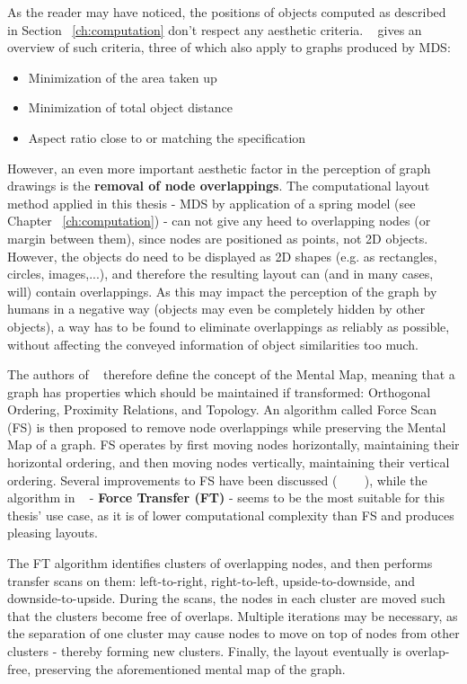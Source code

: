 As the reader may have noticed, the positions of objects computed as described in Section ~\ref{ch:computation} don't respect any aesthetic criteria. ~\cite{Li:2005} gives an overview of such criteria, three of which also apply to graphs produced by MDS:

\begin{itemize}
	\item Minimization of the area taken up
	\item Minimization of total object distance
	\item Aspect ratio close to or matching the specification
\end{itemize}

However, an even more important aesthetic factor in the perception of graph drawings is the \textbf{removal of node overlappings}. The computational layout method applied in this thesis - MDS by application of a spring model (see Chapter ~\ref{ch:computation}) - can not give any heed to overlapping nodes (or margin between them), since nodes are positioned as points, not 2D objects. However, the objects do need to be displayed as 2D shapes (e.g. as rectangles, circles, images,...), and therefore the resulting layout can (and in many cases, will) contain overlappings.
As this may impact the perception of the graph by humans in a negative way (objects may even be completely hidden by other objects), a way has to be found to eliminate overlappings as reliably as possible, without affecting the conveyed information of object similarities too much.

The authors of ~\cite{journals/vlc/MisueELS95} therefore define the concept of the Mental Map, meaning that a graph has properties which should be maintained if transformed: Orthogonal Ordering, Proximity Relations, and Topology. An algorithm called Force Scan (FS) is then proposed to remove node overlappings while preserving the Mental Map of a graph. FS operates by first moving nodes horizontally, maintaining their horizontal ordering, and then moving nodes vertically, maintaining their vertical ordering. Several improvements to FS have been discussed (~\cite{Hayashi:1998:LAP:647550.728930} ~\cite{Huang03force-transfer:a} ~\cite{Li:2005}), while the algorithm in ~\cite{Huang03force-transfer:a} - \textbf{Force Transfer (FT)} - seems to be the most suitable for this thesis' use case, as it is of lower computational complexity than FS and produces pleasing layouts.

The FT algorithm identifies clusters of overlapping nodes, and then performs transfer scans on them: left-to-right, right-to-left, upside-to-downside, and downside-to-upside. During the scans, the nodes in each cluster are moved such that the clusters become free of overlaps. Multiple iterations may be necessary, as the separation of one cluster may cause nodes to move on top of nodes from other clusters - thereby forming new clusters. Finally, the layout eventually is overlap-free, preserving the aforementioned mental map of the graph.

